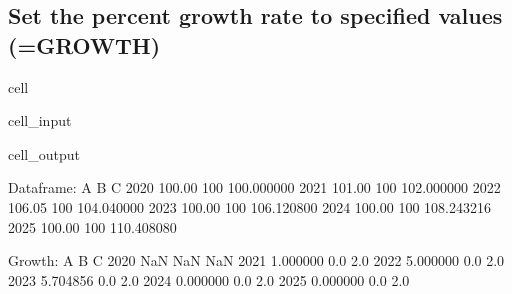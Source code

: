 \documentclass[letterpaper,10pt,english]{jupyterBook}
\begin{document}
\subsection{Set the percent growth rate to specified values (=GROWTH)}
\label{\detokenize{content/04_PythonEssentials/UpdateCommand:set-the-percent-growth-rate-to-specified-values-growth}}
\begin{sphinxuseclass}{cell}\begin{sphinxVerbatimInput}

\begin{sphinxuseclass}{cell_input}
\begin{sphinxVerbatim}[commandchars=\\\{\}]
  
 
\end{sphinxVerbatim}

\end{sphinxuseclass}\end{sphinxVerbatimInput}
\begin{sphinxVerbatimOutput}

\begin{sphinxuseclass}{cell_output}
\begin{sphinxVerbatim}[commandchars=\\\{\}]
Dataframe:
           A    B           C
2020  100.00  100  100.000000
2021  101.00  100  102.000000
2022  106.05  100  104.040000
2023  100.00  100  106.120800
2024  100.00  100  108.243216
2025  100.00  100  110.408080

Growth:
             A    B    C
2020       NaN  NaN  NaN
2021  1.000000  0.0  2.0
2022  5.000000  0.0  2.0
2023 \PYGZhy{}5.704856  0.0  2.0
2024  0.000000  0.0  2.0
2025  0.000000  0.0  2.0
\end{sphinxVerbatim}

\end{sphinxuseclass}\end{sphinxVerbatimOutput}

\end{sphinxuseclass}
\end{document}

